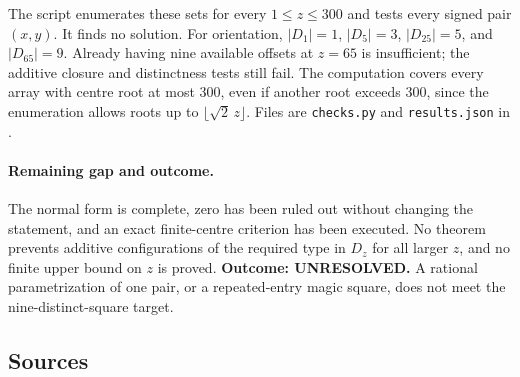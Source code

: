 \documentclass[11pt,a4paper]{article}
\begin{document}
The script enumerates these sets for every $1\le z\le300$ and tests
every signed pair $(x,y)$. It finds no solution. For orientation,
$|D_1|=1$, $|D_5|=3$, $|D_{25}|=5$, and $|D_{65}|=9$.
Already having nine available offsets at $z=65$ is insufficient; the
additive closure and distinctness tests still fail. The computation
covers every array with centre root at most $300$, even if another
root exceeds $300$, since the enumeration allows roots up to
$\lfloor\sqrt2\,z\rfloor$. Files are \texttt{checks.py} and
\texttt{results.json} in
.

\paragraph{Remaining gap and outcome.}
The normal form is complete, zero has been ruled out without changing
the statement, and an exact finite-centre criterion has been executed.
No theorem prevents additive configurations of the required type in
$D_z$ for all larger $z$, and no finite upper bound on $z$ is proved.
\textbf{Outcome: UNRESOLVED.} A rational parametrization of one pair,
or a repeated-entry magic square, does not meet the nine-distinct-square
target.

\subsection{Sources}
\end{document}

